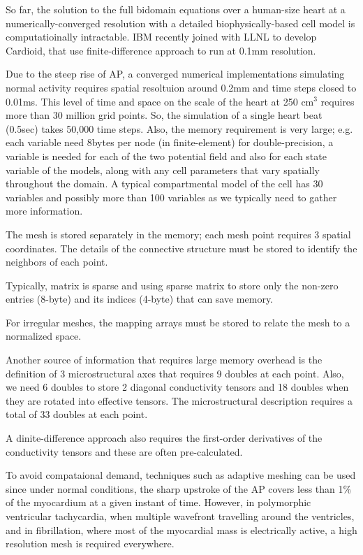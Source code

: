 So far, the solution to the full bidomain equations over a human-size heart at a
numerically-converged resolution with a detailed biophysically-based cell model
is computatioinally intractable. IBM recently joined with LLNL to develop
Cardioid, that use finite-difference approach to run at 0.1mm resolution.


Due to the steep rise of AP, a converged numerical implementations simulating
normal activity requires spatial resoltuion around 0.2mm and time steps closed
to 0.01ms. This level of time and space on the scale of the heart at 250 cm$^3$
requires more than 30 million  grid points. So, the simulation of a single heart
beat (0.5sec) takes 50,000 time steps. Also, the memory requirement is very
large; e.g. each variable need 8bytes per node (in finite-element) for
double-precision, a variable is needed for each of the two potential field and
also for each state variable of the models, along with any cell parameters that
vary spatially throughout the domain. A typical compartmental model of the cell
has 30 variables and possibly more than 100 variables as we typically need
to gather more information.

The mesh is stored separately in the memory; each mesh point requires 3 spatial
coordinates. The details of the connective structure must be stored to identify
the neighbors of each point.

Typically, matrix is sparse and using sparse matrix to store only the non-zero
entries (8-byte) and its indices (4-byte) that can save memory.


For irregular meshes, the mapping arrays must be stored to relate the mesh to a
normalized space. 

Another source of information that requires large memory overhead is the
definition of 3 microstructural axes that requires 9 doubles at each point.
Also, we need 6 doubles to store 2 diagonal conductivity tensors and 18 doubles
when they are rotated into effective tensors. The microstructural description
requires a total of 33 doubles at each point.

A dinite-difference approach also requires the first-order derivatives of the
conductivity tensors and these are often pre-calculated.


To avoid compataional demand, techniques such as adaptive meshing can be used
since under normal conditions, the sharp upstroke of the AP covers less than 1\%
of the myocardium at a given instant of time. However, in polymorphic
ventricular tachycardia, when multiple wavefront travelling around the
ventricles, and in fibrillation, where most of the myocardial mass is
electrically active, a high resolution mesh is required everywhere.


